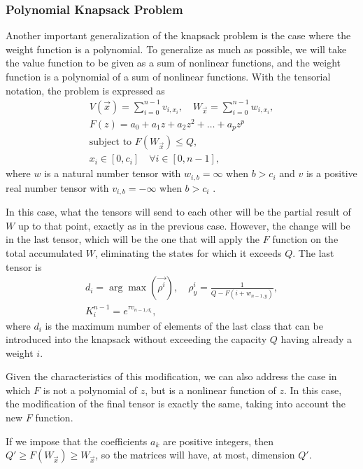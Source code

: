 \subsubsection{Polynomial Knapsack Problem}
Another important generalization of the knapsack problem is the case where the weight function is a polynomial. To generalize as much as possible, we will take the value function to be given as a sum of nonlinear functions, and the weight function is a polynomial of a sum of nonlinear functions. With the tensorial notation, the problem is expressed as
\begin{equation}
    \begin{gathered}
        V(\vec{x})=\sum_{i=0}^{n-1}v_{i,x_i}, \quad W_{\vec{x}}=\sum_{i=0}^{n-1}w_{i,x_i},\\
        F(z)=a_0+a_1z+a_2z^2+\dots+a_pz^p\\
        \text{subject to }F(W_{\vec{x}})\leq{Q},\\
        x_i\in [0,c_i]\quad \forall i\in [0,n-1],
    \end{gathered}
\end{equation}
where $w$ is a natural number tensor with $w_{i,b}=\infty$ when $b>c_i$ and $v$ is a positive real number tensor with $v_{i,b}=-\infty$ when $b>c_i$ .

In this case, what the tensors will send to each other will be the partial result of $W$ up to that point, exactly as in the previous case. However, the change will be in the last tensor, which will be the one that will apply the $F$ function on the total accumulated $W$, eliminating the states for which it exceeds $Q$. The last tensor is
\begin{equation}
    \begin{gathered}
    d_{i}=\arg\max(\vec{\rho^{i}}),\quad \rho^{i}_{y} = \frac{1}{Q-F(i+w_{n-1,y})}, \\
    K^{n-1}_{i}=e^{\tau v_{n-1,d_i}}, 
    \end{gathered}
\end{equation}
where $d_i$ is the maximum number of elements of the last class that can be introduced into the knapsack without exceeding the capacity $Q$ having already a weight $i$.

Given the characteristics of this modification, we can also address the case in which $F$ is not a polynomial of $z$, but is a nonlinear function of $z$. In this case, the modification of the final tensor is exactly the same, taking into account the new $F$ function.

If we impose that the coefficients $a_k$ are positive integers, then $Q'\geq F(W_{\vec{x}})\geq W_{\vec{x}}$, so the matrices will have, at most, dimension $Q'$.

